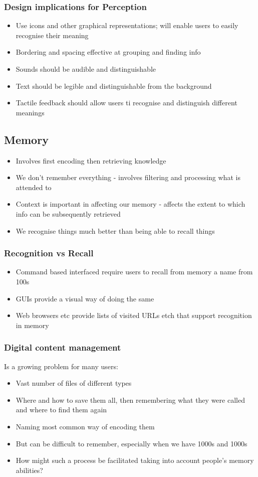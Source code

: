 \documentclass{article}[18pt]
\begin{document}
\subsubsection{Design implications for Perception}
\begin{itemize}
	\item Use icons and other graphical representations; will enable users to easily recognise their meaning
	\item Bordering and spacing effective at grouping and finding info
	\item Sounds should be audible and distinguishable
	\item Text should be legible and distinguishable from the background
	\item Tactile feedback should allow users ti recognise and distinguish different meanings
\end{itemize}
\subsection{Memory}
\begin{itemize}
	\item Involves first encoding then retrieving knowledge
	\item We don't remember everything - involves filtering and processing what is attended to
	\item Context is important in affecting our memory - affects the extent to which info can be subsequently retrieved
	\item We recognise things much better than being able to recall things
\end{itemize}
\subsubsection{Recognition vs Recall}
\begin{itemize}
	\item Command based interfaced require users to recall from memory a name from 100s
	\item GUIs provide a visual way of doing the same
	\item Web browsers etc provide lists of visited URLs etch that support recognition in memory
\end{itemize}
\subsubsection{Digital content management}
Is a growing problem for many users:
\begin{itemize}
	\item Vast number of files of different types
	\item Where and how to save them all, then remembering what they were called and where to find them again
	\item Naming most common way of encoding them
	\item But can be difficult to remember, especially when we have 1000s and 1000s
	\item How might such a process be facilitated taking into account people's memory abilities?
\end{itemize}
\end{document}
